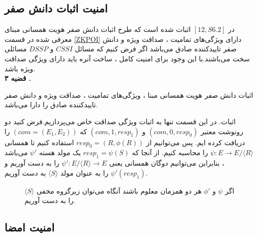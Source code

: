 \subsection{\bf امنیت اثبات دانش صفر}\label{zkp_security}


 در 
$[12,S 6.2]$
اثبات شده است که طرح اثبات دانش صفر هویت همسانی مبنای معرفی شده در قسمت 
\ref{ZKPOI}
دارای ویژگی‌های تمامیت ، صداقت ویژه و دانش صفر تاییدکننده صادق می‌باشد اگر فرض کنیم که مسائل 
$CSSI$
و
$DSSP$
مسائلی سخت می‌باشند.با این وجود برای امنیت کامل ، ساخت آنره باید دارای ویژگی صداقت ویژه باشد.\\

\textbf{قضیه ۳ .}

اثبات دانش صفر هویت همسانی مبنا ، ویژگی‌های تمامیت ، صداقت ویژه و دانش صفر تاییدکننده صادق را دارا می‌باشد.

اثبات. در این قسمت تنها به اثبات ویژگی صداقت خاص می‌پردازیم.فرض کنید دو رونوشت معتبر 
$(com,0,resp_0)$
و
$(com,1,resp_1)$
که 
$(com = (E_1,E_2))$
را دریافت کرده ایم. پس  می‌توانیم از
$resp_0 = (R,\phi(R))$
استفاده کنیم تا همسانی
$\psi : E \rightarrow E/ \langle R \rangle $
را محاسبه کنیم. از آنجا که 
$resp_1 = \psi(S)$
یک مولد هسته 
${\psi}'$
می‌باشد ، بنابراین می‌توانیم دوگان همسانی یعنی
${\psi}' : E/ \langle R \rangle \rightarrow E $
را به دست آوریم و 
${\psi}' (resp_1)$
را به عنوان مولد
$\langle S \rangle $
به دست آوریم.

\begin{figure}[H]
	\begin{center}
		
		
		\caption{
			اگر
			$\psi$
			و
			${\phi}'$    
			هر دو همزمان معلوم باشند آنگاه می‌توان زیرگروه مخفی 
			$\langle S \rangle$
			را به دست آوریم.
		}
		\label{}
		
	\end{center}
\end{figure}

\subsection{امنیت امضا}\label{sign_security}






